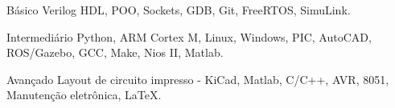 

\begin{cvskills}

  \cvskill
    {Básico} %
    {Verilog HDL, POO, Sockets, GDB, Git, FreeRTOS, SimuLink.} %

  \cvskill
    {Intermediário} %
    {Python, ARM Cortex M, Linux, Windows, PIC, AutoCAD, ROS/Gazebo, GCC, Make, Nios II, Matlab.} %

  \cvskill
    {Avançado} %
    {Layout de circuito impresso - KiCad, Matlab, C/C++, AVR, 8051, Manutenção eletrônica, LaTeX.} %

\end{cvskills}




